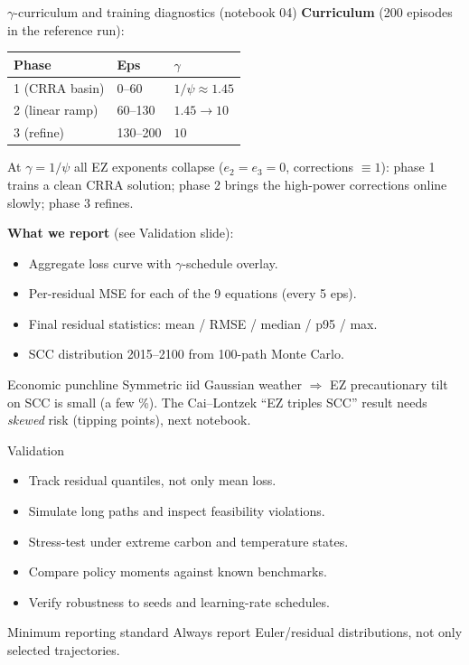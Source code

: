 \documentclass[aspectratio=169,11pt]{beamer}
\newcommand{\emphc}[1]{\textcolor{harvardcrimson}{#1}}
\begin{document}
\begin{frame}{$\gamma$-curriculum and training diagnostics (notebook 04)}
\footnotesize
\textbf{Curriculum} (200 episodes in the reference run):
\begin{center}
\begin{tabular}{lll}
\toprule
\textbf{Phase} & \textbf{Eps} & $\gamma$ \\
\midrule
1 (CRRA basin)  & 0--60   & $1/\psi \approx 1.45$ \\
2 (linear ramp) & 60--130 & $1.45 \to 10$ \\
3 (refine)      & 130--200 & $10$ \\
\bottomrule
\end{tabular}
\end{center}
At $\gamma = 1/\psi$ all EZ exponents collapse ($e_2 = e_3 = 0$, corrections $\equiv 1$): phase 1 trains a clean CRRA solution; phase 2 brings the high-power corrections online slowly; phase 3 refines.

\textbf{What we report} (see Validation slide):
\begin{itemize}\setlength\itemsep{0pt}
    \item Aggregate loss curve with $\gamma$-schedule overlay.
    \item Per-residual MSE for each of the 9 equations (every 5 eps).
    \item Final residual statistics: mean / RMSE / median / p95 / max.
    \item SCC distribution 2015--2100 from 100-path Monte Carlo.
\end{itemize}

\begin{exampleblock}{Economic punchline}
Symmetric iid Gaussian weather $\Rightarrow$ EZ precautionary tilt on SCC is small (a few \%). The Cai--Lontzek ``EZ triples SCC'' result needs \emph{skewed} risk (tipping points), next notebook.
\end{exampleblock}
\vspace{-0.1cm}
\end{frame}

\begin{frame}{Validation}
\begin{itemize}
    \item Track residual quantiles, not only mean loss.
    \item Simulate long paths and inspect feasibility violations.
    \item Stress-test under extreme carbon and temperature states.
    \item Compare policy moments against known benchmarks.
    \item Verify robustness to seeds and learning-rate schedules.
\end{itemize}

\vspace{0.25cm}
\begin{alertblock}{Minimum reporting standard}
Always report Euler/residual \emphc{distributions}, not only selected trajectories.
\end{alertblock}
\end{frame}
\end{document}
